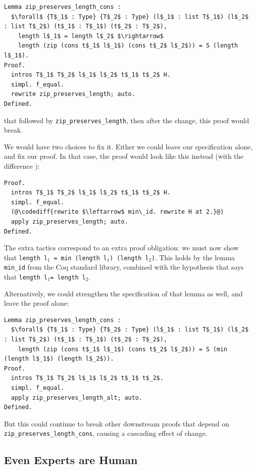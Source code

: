 \begin{lstlisting}
Lemma zip_preserves_length_cons :
  $\forall$ {T$_1$ : Type} {T$_2$ : Type} (l$_1$ : list T$_1$) (l$_2$ : list T$_2$) (t$_1$ : T$_1$) (t$_2$ : T$_2$),
    length l$_1$ = length l$_2$ $\rightarrow$
    length (zip (cons t$_1$ l$_1$) (cons t$_2$ l$_2$)) = S (length l$_1$).
Proof.
  intros T$_1$ T$_2$ l$_1$ l$_2$ t$_1$ t$_2$ H.
  simpl. f_equal.
  rewrite zip_preserves_length; auto.
Defined.
\end{lstlisting}
that followed by \lstinline{zip_preserves_length},
then after the change, this proof would break.

We would have two choices to fix it. Either we could leave our specification alone,
and fix our proof.
In that case,
the proof would look like this instead (with the difference ):

\begin{lstlisting}
Proof.
  intros T$_1$ T$_2$ l$_1$ l$_2$ t$_1$ t$_2$ H.
  simpl. f_equal.
  (@\codediff{rewrite $\leftarrow$ min\_id. rewrite H at 2.}@)
  apply zip_preserves_length; auto.
Defined.
\end{lstlisting}
The extra tactics correspond to an extra proof obligation:
we must now show that \lstinline{length l}$_1$\lstinline{ = min (length l}$_1$\lstinline{) (length l}$_2$\lstinline{)}.
This holds by the lemma \lstinline{min_id} from the Coq standard library, combined with the hypothesis that says that \lstinline{length l}$_1$\lstinline{= length l}$_2$.

Alternatively, we could strengthen the specification of that lemma as well, and leave the proof alone:

\begin{lstlisting}
Lemma zip_preserves_length_cons :
  $\forall$ {T$_1$ : Type} {T$_2$ : Type} (l$_1$ : list T$_1$) (l$_2$ : list T$_2$) (t$_1$ : T$_1$) (t$_2$ : T$_2$),
    length (zip (cons t$_1$ l$_1$) (cons t$_2$ l$_2$)) = S (min (length l$_1$) (length l$_2$)).
Proof.
  intros T$_1$ T$_2$ l$_1$ l$_2$ t$_1$ t$_2$.
  simpl. f_equal.
  apply zip_preserves_length_alt; auto.
Defined.
\end{lstlisting}
But this could continue to break other downstream proofs that depend on \lstinline{zip_preserves_length_cons},
causing a cascading effect of change.

\subsection{Even Experts are Human}
\label{sec:irl}

